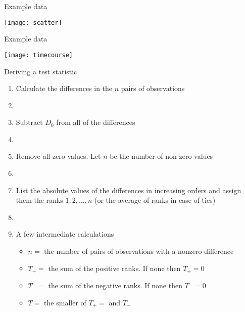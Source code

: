 \documentclass[xcolor=dvipsnames]{beamer}
\begin{document}
\begin{frame}{Example data}
	\begin{center}
		\texttt{[image: scatter]}
	\end{center}
\end{frame}

\begin{frame}{Example data}
\begin{center}
	\texttt{[image: timecourse]}
\end{center}
\end{frame}

\begin{frame}{Deriving a test statistic}
\begin{enumerate}
	\item Calculate the differences in the $n$ pairs of observations
	\item[]
	\item Subtract $D_0$ from all of the differences
	\item[]
	\item Remove all zero values. Let $n$ be the number of non-zero values
	\item[]
	\item List the absolute values of the differences in increasing orders and assign them the ranks $1, 2, \hdots, n$ (or the average of ranks in case of ties)
	\item[]
	\item A few intermediate calculations
	\begin{itemize}
		\item $n =$ the number of pairs of observations with a nonzero difference
		\item $T_+ = $  the sum of the positive ranks. If none then $T_+=0$
		\item $T_- = $ the sum of the negative ranks. If none then $T_- = 0$
		\item $T = $ the smaller of $T_+ = $ and $T_-$ 
	\end{itemize}
\end{enumerate}
\end{frame}
\end{document}
